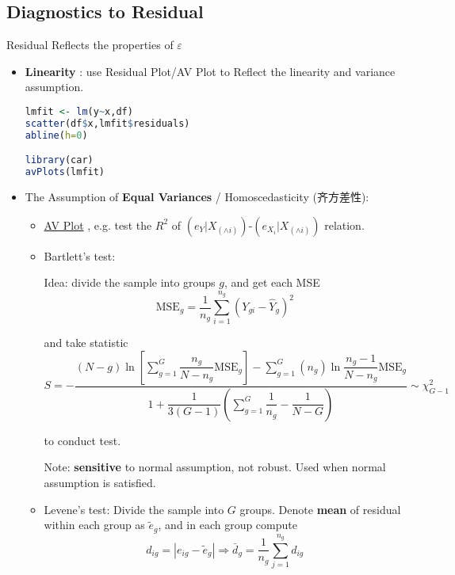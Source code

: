 \subsection{Diagnostics to Residual}\label{SubSecDiagnostics}

\begin{point}
    Residual Reflects the properties of $ \varepsilon  $
\end{point}


\begin{itemize}[topsep=2pt,itemsep=2pt]
    \item \textbf{Linearity} : use Residual Plot/AV Plot to Reflect the linearity and variance assumption.
    
\begin{rcode}
\begin{lstlisting}[language=R]
lmfit <- lm(y~x,df)
scatter(df$x,lmfit$residuals)
abline(h=0)

library(car)
avPlots(lmfit)
\end{lstlisting}

\end{rcode}
    \item The Assumption of \textbf{Equal Variances} / Homoscedasticity (齐方差性): 
    \begin{itemize}[topsep=2pt,itemsep=2pt]
        \item \hyperlink{AVPlot}{AV Plot} , e.g. test the $ R^2 $ of $ (e_Y|X_{(\wedge i)} )$-$( e_{X_i}|X_{(\wedge i)}) $ relation.
        \item Bartlett's test:
        
        Idea: divide the sample into groups $ g $, and get each MSE
        \begin{equation}
             \mathrm{MSE}_g=\dfrac{1}{n_g}\sum_{i=1}^{n_g}(Y_{gi}-\hat{Y}_g)^2
        \end{equation}
        
        and take statistic
        \begin{equation}
            S=-\dfrac{(N-g)\ln\left[ \sum\limits_{g=1}^G \dfrac{n_g}{N-n_g}\mathrm{MSE}_g \right]-\sum\limits_{g=1}^G(n_g)\ln \dfrac{n_g-1}{N-n_g}\mathrm{MSE}_g }{1+\dfrac{1}{3(G-1)}\left(\sum\limits_{g=1}^G \dfrac{1}{n_g}-\dfrac{1}{N-G} \right)} \sim \chi^2_{G-1}
        \end{equation}

        to conduct test. 

        Note: \textbf{sensitive}  to normal assumption, not robust. Used when normal assumption is satisfied.
        \item Levene's test: Divide the sample into $ G $ groups. Denote \textbf{mean}  of residual within each group as $ \tilde{e}_g $, and in each group compute
        \begin{equation}
            d_{ig}=|e_{ig}-\tilde{e}_g| \Rightarrow \bar{d}_{g}=\dfrac{1}{n_g}\sum_{j=1}^{n_g}d_{ig}
        \end{equation}


\end{itemize}
\end{itemize}
